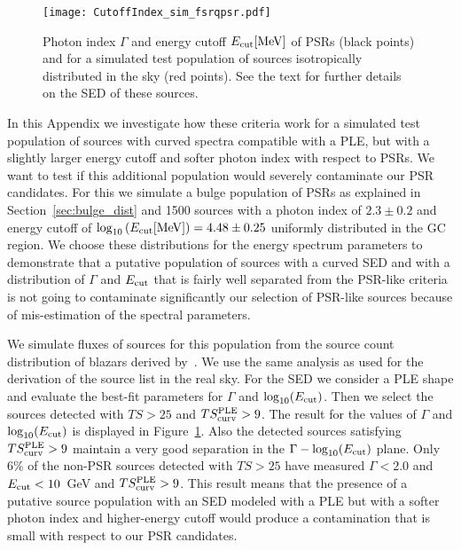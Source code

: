 \documentclass[iop]{emulateapj}
\begin{document}
\begin{figure*}
	\centering
\texttt{[image: CutoffIndex\_sim\_fsrqpsr.pdf]}
\caption{Photon index $\Gamma$ and energy cutoff
  $E_{\rm{cut}}[\rm{MeV}]$ of PSRs (black points) and for a simulated 
  test population of sources isotropically distributed in the sky (red
  points). See the text for further details on the SED of these
  sources.}
\label{fig:psrcurved} 
\end{figure*}

In this Appendix we investigate how these criteria work for a
simulated test population of sources with curved spectra
compatible with a PLE, but with a slightly larger energy cutoff and
softer photon index with respect to PSRs. We want to test if this
additional population would severely contaminate our PSR candidates.
For this we simulate a bulge population of PSRs as explained in
Section~\ref{sec:bulge_dist} and 1500 sources with a photon index of $2.3\pm0.2$
and energy cutoff of $\log_{10}{(E_{\rm{cut}}[\rm{MeV}])} = 4.48\pm 0.25$
uniformly distributed in the GC region.  We choose these distributions
for the energy spectrum parameters to demonstrate that a putative
population of sources with a curved SED and with a distribution of
$\Gamma$ and $E_{\rm{cut}}$ that is fairly well separated from the
PSR-like criteria is not going to contaminate significantly our
selection of PSR-like sources because of mis-estimation of the 
spectral parameters.

We simulate fluxes of sources for this population from the source
count distribution of blazars derived by~\citet{2010ApJ...720..435A}.
We use the same analysis as used for the derivation of the source list
in the real sky.  For the SED we consider a PLE shape and evaluate the
best-fit parameters for $\Gamma$ and $\log_{10}(E_{\rm{cut}})$.  Then
we select the sources detected with $TS>25$ and
$TS^{\rm{PLE}}_{\rm{curv}}>9$.  The result for the values of $\Gamma$
and $\log_{10}(E_{\rm{cut}})$ is displayed in
Figure~\ref{fig:psrcurved}.  Also the detected sources satisfying
$TS^{\rm{PLE}}_{\rm{curv}}>9$ maintain a very good separation in the
$\Gamma-\log_{10}(E_{\rm{cut}})$ plane. 
Only $6\%$ of the non-PSR
sources detected with $TS>25$ have measured $\Gamma<2.0$ 
and $E_{\rm{cut}}<10$~GeV and $TS^{\rm{PLE}}_{\rm{curv}}>9$.
This result means that the presence of a putative source population
with an SED modeled with a PLE but with a softer photon index and
higher-energy cutoff would produce a contamination that is small with
respect to our PSR candidates.
\end{document}
